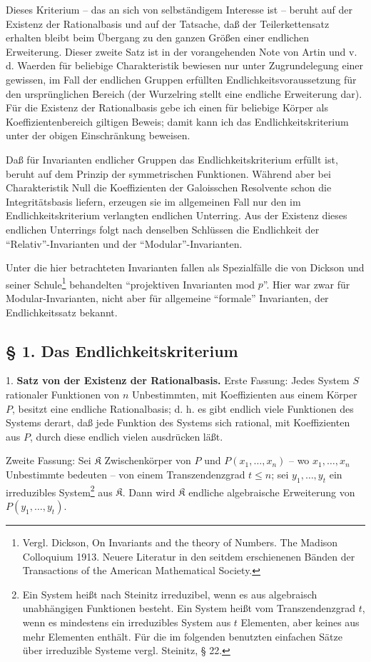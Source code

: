 Dieses Kriterium -- das an sich von selbständigem Interesse ist -- beruht auf der Existenz der Rationalbasis und auf der Tatsache, daß der Teilerkettensatz erhalten bleibt beim Übergang zu den ganzen Größen einer endlichen Erweiterung. Dieser zweite Satz ist in der vorangehenden Note von Artin und v. d. Waerden für beliebige Charakteristik bewiesen nur unter Zugrundelegung einer gewissen, im Fall der endlichen Gruppen erfüllten Endlichkeitsvoraussetzung für den ursprünglichen Bereich (der Wurzelring stellt eine endliche Erweiterung dar). Für die Existenz der Rationalbasis gebe ich einen für beliebige Körper als Koeffizientenbereich giltigen Beweis; damit kann ich das Endlichkeitskriterium unter der obigen Einschränkung beweisen.

Daß für Invarianten endlicher Gruppen das Endlichkeitskriterium erfüllt ist, beruht auf dem Prinzip der symmetrischen Funktionen. Während aber bei Charakteristik Null die Koeffizienten der Galoisschen Resolvente schon die Integritätsbasis liefern, erzeugen sie im allgemeinen Fall nur den im Endlichkeitskriterium verlangten endlichen Unterring. Aus der Existenz dieses endlichen Unterrings folgt nach denselben Schlüssen die Endlichkeit der ``Relativ''-Invarianten und der ``Modular''-Invarianten.

Unter die hier betrachteten Invarianten fallen als Spezialfälle die von Dickson und seiner Schule\footnote{Vergl. Dickson, On Invariants and the theory of Numbers. The Madison Colloquium 1913. Neuere Literatur in den seitdem erschienenen Bänden der Transactions of the American Mathematical Society.} behandelten ``projektiven Invarianten mod $p$''. Hier war zwar für Modular-Invarianten, nicht aber für allgemeine ``formale'' Invarianten, der Endlichkeitssatz bekannt.

\subsection*{§ 1. Das Endlichkeitskriterium}

1. \textbf{Satz von der Existenz der Rationalbasis.} Erste Fassung: Jedes System $S$ rationaler Funktionen von $n$ Unbestimmten, mit Koeffizienten aus einem Körper $P$, besitzt eine endliche Rationalbasis; d. h. es gibt endlich viele Funktionen des Systems derart, daß jede Funktion des Systems sich rational, mit Koeffizienten aus $P$, durch diese endlich vielen ausdrücken läßt.

Zweite Fassung: Sei $\mathfrak K$ Zwischenkörper von $P$ und $P(x_1,\ldots,x_n)$ -- wo $x_1,\ldots,x_n$ Unbestimmte bedeuten -- von einem Transzendenzgrad $t\leq n$; sei $y_1,\ldots,y_t$ ein irreduzibles System\footnote{Ein System heißt nach Steinitz irreduzibel, wenn es aus algebraisch unabhängigen Funktionen besteht. Ein System heißt vom Transzendenzgrad $t$, wenn es mindestens ein irreduzibles System aus $t$ Elementen, aber keines aus mehr Elementen enthält. Für die im folgenden benutzten einfachen Sätze über irreduzible Systeme vergl. Steinitz, § 22.} aus $\mathfrak K$. Dann wird $\mathfrak K$ endliche algebraische Erweiterung von $P(y_1,\ldots,y_t)$.

